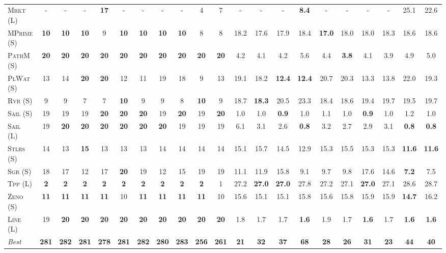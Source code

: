 \documentclass[11pt,landscape]{article}
\begin{document}
\begin{table}[tb]
{\begin{tabular}{|l||cccccccccc||cccccccccc||}
\textsc{Mrkt} (L)&-&-&-&\textbf{17}&-&-&-&-&4&7&-&-&-&\textbf{8.4}&-&-&-&-&25.1&22.6\\
\textsc{MPrime} (S)&\textbf{10}&\textbf{10}&\textbf{10}&9&\textbf{10}&\textbf{10}&\textbf{10}&\textbf{10}&8&8&18.2&17.6&17.9&18.4&\textbf{17.0}&18.0&18.0&18.3&18.6&18.6\\
\textsc{PathM} (S)&\textbf{20}&\textbf{20}&\textbf{20}&\textbf{20}&\textbf{20}&\textbf{20}&\textbf{20}&\textbf{20}&\textbf{20}&\textbf{20}&4.2&4.1&4.2&5.6&4.4&\textbf{3.8}&4.1&3.9&4.9&5.0\\
\textsc{PlWat} (S)&13&14&\textbf{20}&\textbf{20}&12&11&19&18&9&13&19.1&18.2&\textbf{12.4}&\textbf{12.4}&20.7&20.3&13.3&13.8&22.0&19.3\\
\textsc{Rvr} (S)&9&9&7&7&\textbf{10}&9&9&8&\textbf{10}&9&18.7&\textbf{18.3}&20.5&23.3&18.4&18.6&19.4&19.7&19.5&19.7\\
\textsc{Sail} (S)&19&19&19&\textbf{20}&\textbf{20}&\textbf{20}&19&\textbf{20}&19&\textbf{20}&1.0&1.0&\textbf{0.9}&1.0&1.1&1.0&\textbf{0.9}&1.0&1.2&1.0\\
\textsc{Sail} (L)&19&\textbf{20}&\textbf{20}&\textbf{20}&\textbf{20}&\textbf{20}&\textbf{20}&19&19&19&6.1&3.1&2.6&\textbf{0.8}&3.2&2.7&2.9&3.1&\textbf{0.8}&\textbf{0.8}\\
\textsc{Stlrs} (S)&14&13&\textbf{15}&13&13&13&14&14&14&14&15.1&15.7&14.5&12.9&15.3&15.5&15.3&15.3&\textbf{11.6}&\textbf{11.6}\\
\textsc{Sgr} (S)&18&17&12&17&\textbf{20}&19&12&15&19&19&11.1&11.9&15.8&9.1&9.7&9.8&17.6&14.6&\textbf{7.2}&7.5\\
\textsc{Tpp} (L)&\textbf{2}&\textbf{2}&\textbf{2}&\textbf{2}&\textbf{2}&\textbf{2}&\textbf{2}&\textbf{2}&\textbf{2}&1&27.2&\textbf{27.0}&\textbf{27.0}&27.8&27.2&27.1&\textbf{27.0}&27.1&28.6&28.7\\
\textsc{Zeno} (S)&\textbf{11}&\textbf{11}&\textbf{11}&\textbf{11}&10&\textbf{11}&\textbf{11}&\textbf{11}&\textbf{11}&10&15.6&15.1&15.1&15.8&15.6&15.8&15.9&15.9&\textbf{14.7}&16.2\\
\textsc{Line} (L)&19&\textbf{20}&\textbf{20}&\textbf{20}&\textbf{20}&\textbf{20}&\textbf{20}&\textbf{20}&\textbf{20}&\textbf{20}&1.8&1.7&1.7&\textbf{1.6}&1.9&1.7&\textbf{1.6}&1.7&\textbf{1.6}&\textbf{1.6}
\\\hline
\textit{Best}&\textbf{281}&\textbf{282}&\textbf{281}&\textbf{278}&\textbf{281}&\textbf{282}&\textbf{280}&\textbf{283}&\textbf{256}&\textbf{261}&\textbf{21}&\textbf{32}&\textbf{37}&\textbf{68}&\textbf{28}&\textbf{26}&\textbf{31}&\textbf{23}&\textbf{44}&\textbf{40}\\\hline

        \end{tabular}}
        \caption{}
        \label{tab:table-4}
        \end{table}
        
\end{document}
